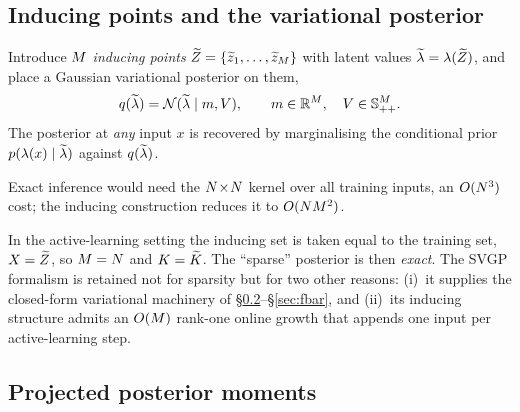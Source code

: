 \subsection{Inducing points and the variational posterior}\label{sec:inducing}

\begin{definition}
Introduce $M$ \emph{inducing points} $\widetilde{Z}=\{\widetilde{z}_1,\dots,\widetilde{z}_{M}\}$
with latent values $\widetilde{\lambda}=\lambda(\widetilde{Z})$, and place a
Gaussian variational posterior on them,
\begin{equation}
  q(\widetilde{\lambda})=\mathcal{N}(\widetilde{\lambda}\mid m,V),\qquad
  m\in\mathbb{R}^{M},\quad V\in\mathbb{S}_{++}^{M}.
  \label{eq:qdef}
\end{equation}
The posterior at \emph{any} input $x$ is recovered by marginalising the
conditional prior $p(\lambda(x)\mid\widetilde{\lambda})$ against $q(\widetilde{\lambda})$.
\end{definition}

Exact inference would need the $N\!\times\!N$ kernel over all training
inputs, an $O(N^3)$ cost; the inducing construction reduces it to
$O(NM^2)$.

\begin{remark}[Active-learning invariant $\Mind=\Ntr$]\label{rem:MeqN}
In the active-learning setting the inducing set is taken equal to the training
set, $X=\widetilde{Z}$, so $\Mind=\Ntr$ and $K=\widetilde{K}$. The ``sparse'' posterior is then
\emph{exact}. The SVGP formalism is retained not for sparsity but for two other
reasons: (i)~it supplies the closed-form variational machinery of
\S\ref{sec:predmoments}--\S\ref{sec:fbar}, and (ii)~its inducing structure admits
an $O(M)$ rank-one online growth that appends one input per active-learning
step.
\end{remark}

\subsection{Projected posterior moments}\label{sec:predmoments}

